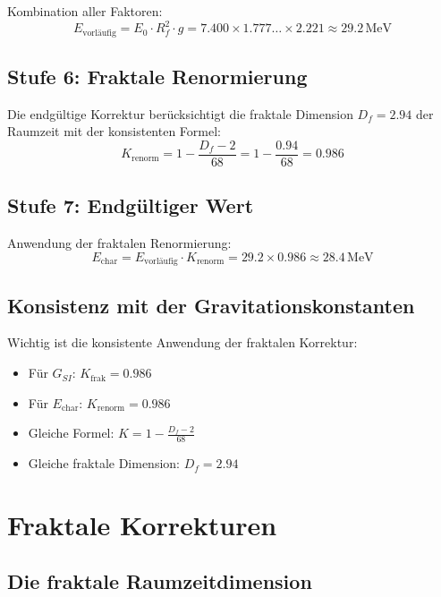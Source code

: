 \documentclass[12pt,a4paper]{article}
\begin{document}
	Kombination aller Faktoren:
	\begin{equation}
		E_{\text{vorläufig}} = E_0 \cdot R_f^2 \cdot g = 7.400 \times 1.777\ldots \times 2.221 \approx 29.2\,\text{MeV}
	\end{equation}
	
	\subsection{Stufe 6: Fraktale Renormierung}
	
	Die endgültige Korrektur berücksichtigt die fraktale Dimension $D_f = 2.94$ der Raumzeit mit der konsistenten Formel:
	\begin{equation}
		K_{\text{renorm}} = 1 - \frac{D_f - 2}{68} = 1 - \frac{0.94}{68} = 0.986
	\end{equation}
	
	\subsection{Stufe 7: Endgültiger Wert}
	
	Anwendung der fraktalen Renormierung:
	\begin{equation}
		E_{\text{char}} = E_{\text{vorläufig}} \cdot K_{\text{renorm}} = 29.2 \times 0.986 \approx 28.4\,\text{MeV}
	\end{equation}
	
	\subsection{Konsistenz mit der Gravitationskonstanten}
	
	Wichtig ist die konsistente Anwendung der fraktalen Korrektur:
	\begin{itemize}
		\item Für $G_{SI}$: $K_{\text{frak}} = 0.986$
		\item Für $E_{\text{char}}$: $K_{\text{renorm}} = 0.986$
		\item Gleiche Formel: $K = 1 - \frac{D_f - 2}{68}$
		\item Gleiche fraktale Dimension: $D_f = 2.94$
	\end{itemize}
	
	\section{Fraktale Korrekturen}
	
	\subsection{Die fraktale Raumzeitdimension}
	
\end{document}

